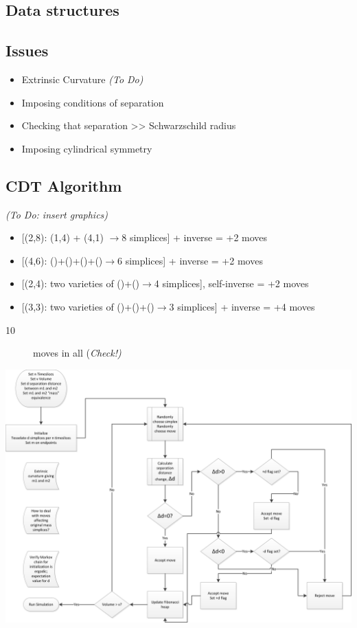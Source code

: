 \documentclass{article}
\begin{document}
\subsection{Data structures}

\subsection{Issues}

\begin{itemize}
\item Extrinsic Curvature \emph{(To Do)}
\item Imposing conditions of separation
\item Checking that separation >\textcompwordmark{}> Schwarzschild radius
\item Imposing cylindrical symmetry
\end{itemize}

\subsection{CDT Algorithm}

\emph{(To Do: insert graphics)}

\begin{itemize}
\item {[}(2,8): (1,4) + (4,1) $\rightarrow$8 simplices{]} + inverse = +2
moves
\item {[}(4,6): ()+()+()+()$\rightarrow$6 simplices{]} + inverse = +2 moves
\item {[}(2,4): two varieties of ()+()$\rightarrow$4 simplices{]}, self-inverse
= +2 moves
\item {[}(3,3): two varieties of ()+()+()$\rightarrow$3 simplices{]} +
inverse = +4 moves\end{itemize}
\begin{description}
\item [{10}] moves in all (\emph{Check!)}
\end{description}

\includegraphics[scale=0.35]{Initialization}
\end{document}
